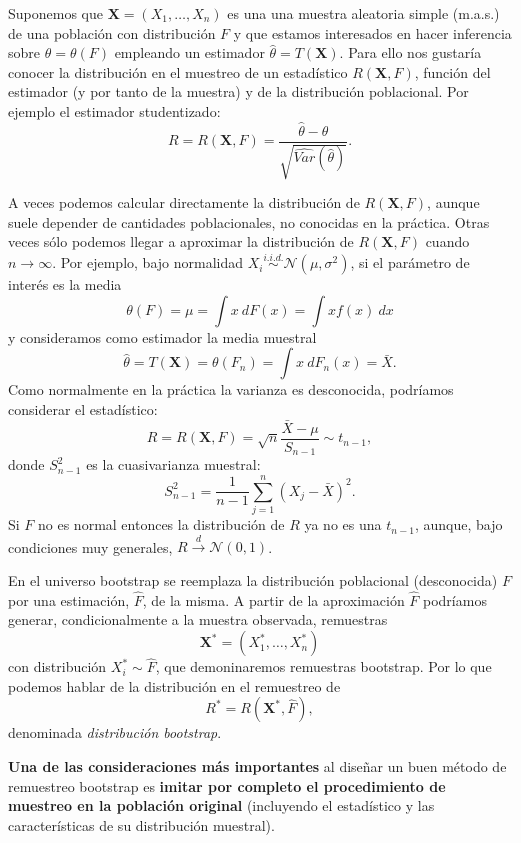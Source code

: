 \documentclass[
  spanish,
  10pt,
]{book}
\renewcommand{\mathbf}[1]{\symbf{#1}}
\theoremstyle{break}
\theoremstyle{nonumberplain}
\begin{document}
Suponemos que \(\mathbf{X}=\left( X_1,\ldots ,X_n \right)\) es una una muestra aleatoria simple (m.a.s.)
de una población con distribución \(F\) y que estamos interesados en hacer inferencia sobre \(\theta =\theta \left(F \right)\) empleando un estimador \(\hat{\theta} = T\left( \mathbf{X} \right)\).
Para ello nos gustaría conocer la distribución en el muestreo de un estadístico \(R\left( \mathbf{X},F \right)\), función del estimador (y por tanto de la muestra) y de la distribución poblacional.
Por ejemplo el estimador studentizado:
\[R=R\left( \mathbf{X},F \right) = \frac{\hat \theta - \theta}{\sqrt{\widehat{Var}(\hat \theta)}}.\]

A veces podemos calcular directamente la distribución de \(R\left( \mathbf{X},F \right)\), aunque suele depender de cantidades poblacionales, no conocidas en la práctica.
Otras veces sólo podemos llegar a aproximar la distribución de \(R\left( \mathbf{X},F \right)\) cuando \(n \rightarrow \infty\).
Por ejemplo, bajo normalidad \(X_i \overset{i.i.d.}{\sim} \mathcal{N}\left( \mu ,\sigma^2 \right)\), si el parámetro de interés es la media
\[\theta \left( F \right) =\mu =\int x~dF\left( x \right) =\int xf\left( x \right) ~dx\]
y consideramos como estimador la media muestral
\[\hat{\theta} = T\left( \mathbf{X} \right) = \theta \left( F_n \right) =\int x~dF_n\left( x \right) =\bar{X}.\]
Como normalmente en la práctica la varianza es desconocida, podríamos considerar el estadístico:
\[R=R\left( \mathbf{X},F \right) =\sqrt{n}\frac{\bar{X}-\mu }{S_{n-1}} \sim t_{n-1},\]
donde \(S_{n-1}^2\) es la cuasivarianza muestral:
\[S_{n-1}^2=\frac{1}{n-1}\sum_{j=1}^{n}\left( X_j-\bar{X} \right)^2.\]
Si \(F\) no es normal entonces la distribución de \(R\) ya no es una \(t_{n-1}\),
aunque, bajo condiciones muy generales, \(R\overset{d}{\rightarrow}\mathcal{N}\left(0,1 \right)\).

En el universo bootstrap se reemplaza la distribución poblacional (desconocida) \(F\) por una estimación, \(\hat{F}\), de la misma.
A partir de la aproximación \(\hat{F}\) podríamos generar, condicionalmente a la muestra observada, remuestras
\[\mathbf{X}^{\ast}=\left( X_1^{\ast},\ldots ,X_n^{\ast} \right)\]
con distribución \(X_i^{\ast} \sim \hat{F}\), que demoninaremos remuestras bootstrap.
Por lo que podemos hablar de la distribución en el remuestreo de
\[R^{\ast}=R\left( \mathbf{X}^{\ast},\hat{F} \right),\]
denominada \emph{distribución bootstrap}.

\textbf{Una de las consideraciones más importantes} al diseñar un buen método de remuestreo bootstrap es \textbf{imitar por completo el procedimiento de muestreo en la población original} (incluyendo el estadístico y las características de su distribución muestral).
\end{document}
